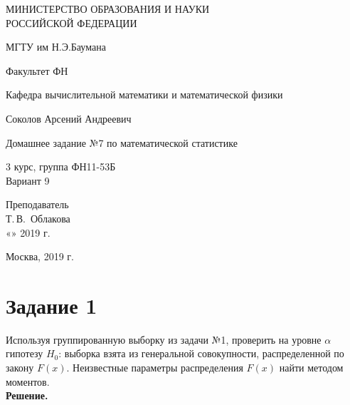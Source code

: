 \documentclass[14pt,a4paper]{scrartcl}
\begin{document}
	\begin{titlepage}
	\begin{center}
		\large
		МИНИСТЕРСТВО ОБРАЗОВАНИЯ И НАУКИ\\ РОССИЙСКОЙ ФЕДЕРАЦИИ
		
		\vspace{0.5cm}
		
		МГТУ им Н.Э.Баумана
		\vspace{0.25cm}
		
		Факультет ФН
		
		Кафедра вычислительной математики и математической физики
		\vfill
		
		
		Соколов Арсений Андреевич\\
		\vfill
		
		
		{\LARGE Домашнее задание №7 по математической статистике\\[2mm]
		}
		\bigskip
		
		3 курс, группа ФН11-53Б\\
		Вариант 9
	\end{center}
	\vfill
	
	\newlength{\ML}
	\hfill\begin{minipage}{0.4\textwidth}
		Преподаватель\\
		\underline{\hspace{3cm}} Т.\,В.~Облакова\\
		«\underline{\hspace{0.7cm}}» \underline{\hspace{1.71cm}} 2019 г.
	\end{minipage}%
	\bigskip
	
	
	\vfill
	
	\begin{center}
		Москва, 2019 г.
	\end{center}
\end{titlepage}

\section*{Задание 1}


Используя группированную выборку из задачи №1, проверить на уровне $\alpha$ гипотезу $H_0$: выборка взята из генеральной совокупности, распределенной по закону $F(x)$. Неизвестные параметры распределения $F(x)$ найти методом моментов.\\
\textbf{Решение.}\\
\end{document}
